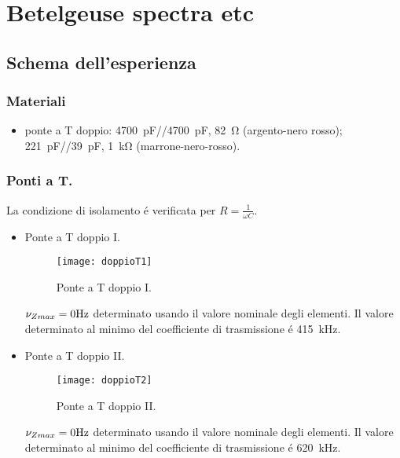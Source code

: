 \documentclass[main.tex]{subfiles}
\begin{document}

\chapter{Betelgeuse spectra etc}

\section{Schema dell'esperienza}

\subsection{Materiali}

\begin{itemize}
\item ponte a T doppio: \SI{4700}{\pico\farad}//\SI{4700}{\pico\farad}, \SI{82}{\ohm} (argento-nero rosso); \SI{221}{\pico\farad}//\SI{39}{\pico\farad}, \SI{1}{\kilo\ohm} (marrone-nero-rosso).
\end{itemize}

\subsection{Ponti a T.}
La condizione di isolamento \'e verificata per $R=\frac{1}{\omega C}$.
\begin{itemize}
\item Ponte a T doppio I.
\begin{figure}[!ht]\centering\texttt{[image: doppioT1]}\caption{Ponte a T doppio I.}\label{fig:T1}\end{figure}
\edef\RT{82}   %
\edef\CT{4700*(10)^(-12)}   %
$\nu_{Zmax}=\pgfmathparse{((\CT*\RT)^(-1))/(2*pi)}\pgfmathprintnumber{\pgfmathresult}\si{\hertz}$ determinato usando il valore nominale degli elementi. Il valore determinato al minimo del coefficiente di trasmissione \'e \SI{415}{\kilo\hertz}.

\item Ponte a T doppio II.
\begin{figure}[!ht]\centering\texttt{[image: doppioT2]}\caption{Ponte a T doppio II.}\label{fig:T2}\end{figure}
\edef\RT{1000}   %
\edef\CT{(39+221)*10^(-12)}   %
$\nu_{Zmax}=\pgfmathparse{((\CT*\RT)^(-1))/(2*pi)}\pgfmathprintnumber{\pgfmathresult}\si{\hertz}$ determinato usando il valore nominale degli elementi. Il valore determinato al minimo del coefficiente di trasmissione \'e \SI{620}{\kilo\hertz}.

\end{itemize}
\end{document}
